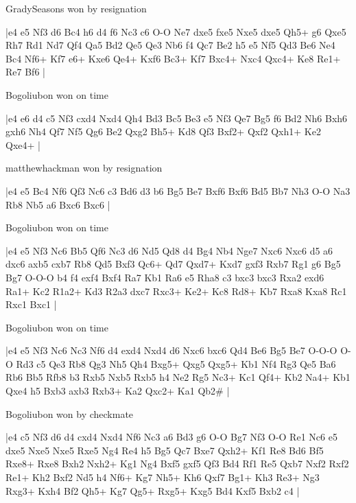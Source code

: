 \showboard

GradySeasons won by resignation

\makegametitle
|e4 e5 Nf3 d6 Bc4 h6 d4 f6 Nc3 c6 O-O Ne7 dxe5 fxe5 Nxe5 dxe5 Qh5+ g6 Qxe5 Rh7 Rd1 Nd7 Qf4 Qa5 Bd2 Qe5 Qe3 Nb6 f4 Qc7 Be2 h5 e5 Nf5 Qd3 Be6 Ne4 Bc4 Nf6+ Kf7 e6+ Kxe6 Qe4+ Kxf6 Bc3+ Kf7 Bxc4+ Nxc4 Qxc4+ Ke8 Re1+ Re7 Bf6  |

\showboard

Bogoliubon won on time

\makegametitle
|e4 e6 d4 c5 Nf3 cxd4 Nxd4 Qh4 Bd3 Bc5 Be3 e5 Nf3 Qe7 Bg5 f6 Bd2 Nh6 Bxh6 gxh6 Nh4 Qf7 Nf5 Qg6 Be2 Qxg2 Bh5+ Kd8 Qf3 Bxf2+ Qxf2 Qxh1+ Ke2 Qxe4+  |

\showboard

matthewhackman won by resignation

\makegametitle
|e4 e5 Bc4 Nf6 Qf3 Nc6 c3 Bd6 d3 b6 Bg5 Be7 Bxf6 Bxf6 Bd5 Bb7 Nh3 O-O Na3 Rb8 Nb5 a6 Bxc6 Bxc6  |

\showboard

Bogoliubon won on time

\makegametitle
|e4 e5 Nf3 Nc6 Bb5 Qf6 Nc3 d6 Nd5 Qd8 d4 Bg4 Nb4 Nge7 Nxc6 Nxc6 d5 a6 dxc6 axb5 cxb7 Rb8 Qd5 Bxf3 Qc6+ Qd7 Qxd7+ Kxd7 gxf3 Rxb7 Rg1 g6 Bg5 Bg7 O-O-O b4 f4 exf4 Bxf4 Ra7 Kb1 Ra6 e5 Rha8 c3 bxc3 bxc3 Rxa2 exd6 Ra1+ Kc2 R1a2+ Kd3 R2a3 dxc7 Rxc3+ Ke2+ Kc8 Rd8+ Kb7 Rxa8 Kxa8 Rc1 Rxc1 Bxc1  |

\showboard

Bogoliubon won on time

\makegametitle
|e4 e5 Nf3 Nc6 Nc3 Nf6 d4 exd4 Nxd4 d6 Nxc6 bxc6 Qd4 Be6 Bg5 Be7 O-O-O O-O Rd3 c5 Qe3 Rb8 Qg3 Nh5 Qh4 Bxg5+ Qxg5 Qxg5+ Kb1 Nf4 Rg3 Qe5 Ba6 Rb6 Bb5 Rfb8 b3 Rxb5 Nxb5 Rxb5 h4 Ne2 Rg5 Nc3+ Kc1 Qf4+ Kb2 Na4+ Kb1 Qxe4 h5 Bxb3 axb3 Rxb3+ Ka2 Qxc2+ Ka1 Qb2\#  |

\showboard

Bogoliubon won by checkmate

\makegametitle
|e4 c5 Nf3 d6 d4 cxd4 Nxd4 Nf6 Nc3 a6 Bd3 g6 O-O Bg7 Nf3 O-O Re1 Nc6 e5 dxe5 Nxe5 Nxe5 Rxe5 Ng4 Re4 h5 Bg5 Qc7 Bxe7 Qxh2+ Kf1 Re8 Bd6 Bf5 Rxe8+ Rxe8 Bxh2 Nxh2+ Kg1 Ng4 Bxf5 gxf5 Qf3 Bd4 Rf1 Re5 Qxb7 Nxf2 Rxf2 Re1+ Kh2 Bxf2 Nd5 h4 Nf6+ Kg7 Nh5+ Kh6 Qxf7 Bg1+ Kh3 Re3+ Ng3 Rxg3+ Kxh4 Bf2 Qh5+ Kg7 Qg5+ Rxg5+ Kxg5 Bd4 Kxf5 Bxb2 c4  |

